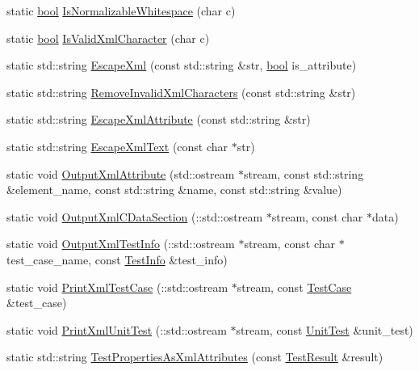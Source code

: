 \begin{DoxyCompactItemize}
\item 
static \hyperlink{classbool}{bool} \hyperlink{classtesting_1_1internal_1_1XmlUnitTestResultPrinter_af9d5af6e5d0c505d5c3bd50a8d2a8d76}{Is\+Normalizable\+Whitespace} (char c)
\item 
static \hyperlink{classbool}{bool} \hyperlink{classtesting_1_1internal_1_1XmlUnitTestResultPrinter_a2b83a24e3ec8544efa1156f9d6e51873}{Is\+Valid\+Xml\+Character} (char c)
\item 
static std\+::string \hyperlink{classtesting_1_1internal_1_1XmlUnitTestResultPrinter_adadf42cf46ade9b26743466ce4b52f36}{Escape\+Xml} (const std\+::string \&str, \hyperlink{classbool}{bool} is\+\_\+attribute)
\item 
static std\+::string \hyperlink{classtesting_1_1internal_1_1XmlUnitTestResultPrinter_aa14cb72f42a346841482cbafa65e3155}{Remove\+Invalid\+Xml\+Characters} (const std\+::string \&str)
\item 
static std\+::string \hyperlink{classtesting_1_1internal_1_1XmlUnitTestResultPrinter_aad574d7bb0c24578d5acc57817b9d367}{Escape\+Xml\+Attribute} (const std\+::string \&str)
\item 
static std\+::string \hyperlink{classtesting_1_1internal_1_1XmlUnitTestResultPrinter_a934486bda28e7013f2d07520d5098a31}{Escape\+Xml\+Text} (const char $\ast$str)
\item 
static void \hyperlink{classtesting_1_1internal_1_1XmlUnitTestResultPrinter_aa8ca7066de948d26d171597430c75839}{Output\+Xml\+Attribute} (std\+::ostream $\ast$stream, const std\+::string \&element\+\_\+name, const std\+::string \&name, const std\+::string \&value)
\item 
static void \hyperlink{classtesting_1_1internal_1_1XmlUnitTestResultPrinter_a41bccd75f54932c5b3b8cce1f94dbd54}{Output\+Xml\+C\+Data\+Section} (\+::std\+::ostream $\ast$stream, const char $\ast$data)
\item 
static void \hyperlink{classtesting_1_1internal_1_1XmlUnitTestResultPrinter_af642843faed4cd28c77d688f6f2820d7}{Output\+Xml\+Test\+Info} (\+::std\+::ostream $\ast$stream, const char $\ast$test\+\_\+case\+\_\+name, const \hyperlink{classtesting_1_1TestInfo}{Test\+Info} \&test\+\_\+info)
\item 
static void \hyperlink{classtesting_1_1internal_1_1XmlUnitTestResultPrinter_a7f7accabeac896d4271f36d24ca02dba}{Print\+Xml\+Test\+Case} (\+::std\+::ostream $\ast$stream, const \hyperlink{classtesting_1_1TestCase}{Test\+Case} \&test\+\_\+case)
\item 
static void \hyperlink{classtesting_1_1internal_1_1XmlUnitTestResultPrinter_a3be1c8766241d0f34cdf59b45a52f73b}{Print\+Xml\+Unit\+Test} (\+::std\+::ostream $\ast$stream, const \hyperlink{classtesting_1_1UnitTest}{Unit\+Test} \&unit\+\_\+test)
\item 
static std\+::string \hyperlink{classtesting_1_1internal_1_1XmlUnitTestResultPrinter_aaac4f1352a2cc46f6a69994d45999f0b}{Test\+Properties\+As\+Xml\+Attributes} (const \hyperlink{classtesting_1_1TestResult}{Test\+Result} \&result)
\end{DoxyCompactItemize}
